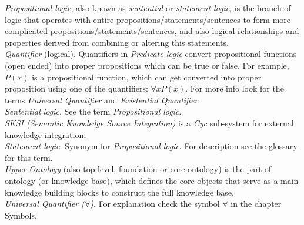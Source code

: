 \emph{Propositional logic}, also known as \emph{sentential} or 
\emph{statement logic}, is the branch of logic that operates with entire
propositions/statements/sentences to form more complicated 
propositions/statements/sentences, and also logical relationships and properties
derived from combining  or altering this statements.\\

\emph{Quantifier} (logical). Quantifiers in \emph{Predicate logic} convert
propositional functions (open ended) into proper propositions which can be true
or false. For example, $P(x)$ is a propositional function, which can get
converted into proper proposition using one of the quantifiers: 
$\forall x P(x)$. For more info look for the terms \emph{Universal Quantifier}
and \emph{Existential Quantifier}.\\

\emph{Sentential logic}. See the term \emph{Propositional logic}.\\

\emph{SKSI (Semantic Knowledge Source Integration)} is a \emph{Cyc} sub-system
for external knowledge integration.\\

\emph{Statement logic}. Synonym for \emph{Propositional logic}. For description
see the glossary for this term.\\

\emph{Upper Ontology} (also top-level, foundation or core ontology) is the part
of ontology (or knowledge base), which defines the core objects that serve as a
main knowledge building blocks to construct the full knowledge base.\\

\emph{Universal Quantifier ($\forall$)}. For explanation check the symbol 
$\forall$ in the chapter Symbols. \\
